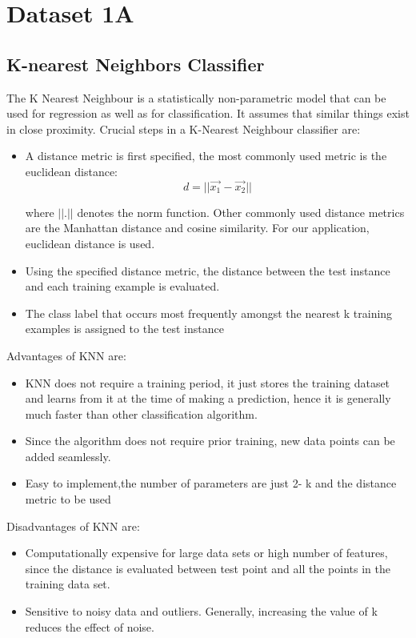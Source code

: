 \documentclass[11pt,a4paper]{article}
\newcommand{\noi}{\noindent}
\begin{document}
{\hypersetup{linkcolor=black}
 \tableofcontents}
\break


\section{Dataset 1A}
\subsection{K-nearest Neighbors Classifier}

The K Nearest Neighbour is a statistically non-parametric model that can be used for regression as well as for classification. It assumes that similar things exist in close proximity.  
\noi
Crucial steps in a K-Nearest Neighbour classifier are:
\begin{itemize}
    \itemsep0em
    \item A distance metric is first specified, the most commonly used metric is the euclidean distance:
    \begin{equation}
        d=||\vec{x_{1}}-\Vec{x_{2}}||
    \end{equation}
    
    where $||.||$ denotes the norm function. Other commonly used distance metrics are the Manhattan distance and cosine similarity. For our application, euclidean distance is used. 
    \item Using the specified distance metric, the distance between the test instance and each training example is evaluated.
    \item The class label that occurs most frequently amongst the nearest k training examples is assigned to the test instance\\
\end{itemize}

\noi
Advantages of KNN are:
\begin{itemize}
    \itemsep0em
    \item KNN does not require a training period, it just stores the training dataset and learns from it at the time of making a prediction, hence it is generally much faster than other classification algorithm.
    \item Since the algorithm does not require prior training, new data points can be added seamlessly. 
    \item Easy to implement,the number of parameters are just 2- k and the distance metric to be used 
\end{itemize}

\noi
Disadvantages of KNN are:
\begin{itemize}
    \itemsep0em
    \item Computationally expensive for large data sets or high number of features, since the distance is evaluated between test point and all the points in the training data set. 
    \item Sensitive to noisy data and outliers. Generally, increasing the value of k reduces the effect of noise.
\end{itemize}
\end{document}

